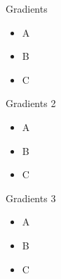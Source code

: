 \begin{frame}{Gradients}
    \begin{itemize}
        \item A
        \item B
        \item C
    \end{itemize}
\end{frame}

\begin{frame}{Gradients 2}
    \begin{itemize}
        \item A
        \item B
        \item C
    \end{itemize}
\end{frame}

\begin{frame}{Gradients 3}
    \begin{itemize}
        \item A
        \item B
        \item C
    \end{itemize}
\end{frame}